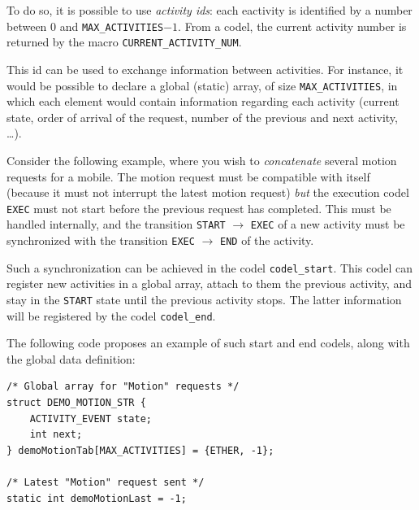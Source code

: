 To  do so, it is  possible to use \emph{activity  ids}: each eactivity is
identified by a number between  $0$ and \texttt{MAX\_ACTIVITIES}$-1$. From a
codel,   the current  activity number  is    returned by the  macro  
\texttt{CURRENT\_ACTIVITY\_NUM}.

This  id can be  used  to exchange   information between activities.  For
instance, it would  be possible to  declare  a global (static) array,  of
size \texttt{MAX\_ACTIVITIES},    in which   each  element   would  contain
information regarding each activity  (current state, order of  arrival of
the request, number of the previous and next activity, \ldots).

Consider  the following  example,  where  you wish  to \emph{concatenate}
several motion  requests  for a   mobile.  The  motion  request  must  be
compatible with  itself (because it must not  interrupt the latest motion
request)  \emph{but} the execution codel  \texttt{EXEC} must not start before
the previous request has completed.  This must be handled internally, and
the  transition \texttt{START}  $\rightarrow$  \texttt{EXEC}  of a new activity
must be  synchronized with the  transition \texttt{EXEC} $\rightarrow$ 
\texttt{END} of the activity.

Such  a  synchronization     can  be  achieved   in     the   codel  
\texttt{codel\_start}. This codel can register new activities in a global
array, attach to them the previous activity, and  stay in the \texttt{START}
state  until the previous activity  stops. The latter information will be
registered by the codel \texttt{codel\_end}.

The following  code  proposes an  example of such   start and end codels,
along with the global data definition:


\begin{center}\begin{cartouche}\small\begin{verbatim}
/* Global array for "Motion" requests */
struct DEMO_MOTION_STR {
    ACTIVITY_EVENT state;
    int next;
} demoMotionTab[MAX_ACTIVITIES] = {ETHER, -1};

/* Latest "Motion" request sent */
static int demoMotionLast = -1; 
\end{verbatim}\end{cartouche}\end{center}

